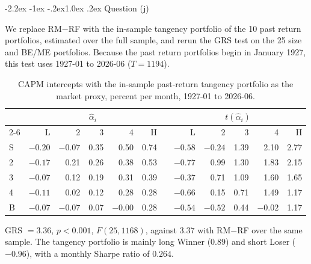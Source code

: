 \documentclass[11pt]{article}
\makeatletter
\renewcommand\subsection{\@startsection{subsection}{2}{0pt}%
  {-2.2ex \@plus -1ex \@minus -.2ex}{1.0ex \@plus .2ex}%
  {\normalfont\bfseries\normalsize\color{psink}}}
\makeatother
\begin{document}
\subsection{Question (j)}

We replace RM$-$RF with the in-sample tangency portfolio of the 10 past
return portfolios, estimated over the full sample, and rerun the GRS test on
the 25 size and BE/ME portfolios. Because the past return portfolios begin in
January 1927, this test uses 1927-01 to 2026-06 ($T = 1194$).

\begin{table}[H]
\centering
\caption{CAPM intercepts with the in-sample past-return tangency portfolio
as the market proxy, percent per month, 1927-01 to 2026-06.}
\small
\begin{tabular}{lrrrrrcrrrrr}
\toprule
& \multicolumn{5}{c}{$\hat\alpha_i$} && \multicolumn{5}{c}{$t(\hat\alpha_i)$} \\
\cmidrule{2-6}\cmidrule{8-12}
& L & 2 & 3 & 4 & H && L & 2 & 3 & 4 & H \\
\midrule
S & $-0.20$ & $-0.07$ & 0.35 & 0.50 & 0.74 && $-0.58$ & $-0.24$ & 1.39 & 2.10 & 2.77 \\
2 & $-0.17$ & 0.21 & 0.26 & 0.38 & 0.53 && $-0.77$ & 0.99 & 1.30 & 1.83 & 2.15 \\
3 & $-0.07$ & 0.12 & 0.19 & 0.31 & 0.39 && $-0.37$ & 0.71 & 1.09 & 1.60 & 1.65 \\
4 & $-0.11$ & 0.02 & 0.12 & 0.28 & 0.28 && $-0.66$ & 0.15 & 0.71 & 1.49 & 1.17 \\
B & $-0.07$ & $-0.07$ & 0.07 & $-0.00$ & 0.28 && $-0.54$ & $-0.52$ & 0.44 & $-0.02$ & 1.17 \\
\bottomrule
\end{tabular}
\label{tab:p3j}
\vspace{2pt}\begin{minipage}{0.93\textwidth}\footnotesize
GRS $= 3.36$, $p < 0.001$, $F(25, 1168)$, against $3.37$ with RM$-$RF over
the same sample. The tangency portfolio is mainly long Winner ($0.89$) and
short Loser ($-0.96$), with a monthly Sharpe ratio of $0.264$.
\end{minipage}
\end{table}
\end{document}
